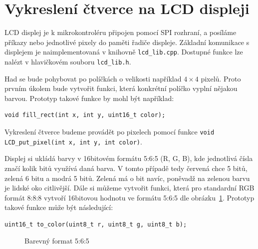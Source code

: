 \documentclass[12pt]{article}
\begin{document}
\section{Vykreslení čtverce na LCD displeji}
LCD displej je k mikrokontroléru připojen pomocí SPI rozhraní, a posíláme příkazy nebo jednotlivé pixely do paměti řadiče displeje.
Základní komunikace s displejem je naimplementovaná v knihovně \texttt{lcd\_lib.cpp}.
Dostupné funkce lze nalézt v hlavičkovém souboru \texttt{lcd\_lib.h}.

Had se bude pohybovat po políčkách o velikosti například $4\times4$ pixelů.
Proto prvním úkolem bude vytvořit funkci, která konkrétní políčko vyplní nějakou barvou.
Prototyp takové funkce by mohl být například:
\begin{verbatim}
void fill_rect(int x, int y, uint16_t color);
\end{verbatim}
Vykreslení čtverce budeme provádět po pixelech pomocí funkce \texttt{void LCD_put_pixel(int x, int y, int color)}.

Displej si ukládá barvy v 16bitovém formátu 5:6:5 (R, G, B), kde jednotlivá čísla značí kolik bitů využívá daná barva.
V tomto případě tedy červená chce 5 bitů, zelená 6 bitu a modrá 5 bitů.
Zelená má o bit navíc, poněvadž na zelenou barvu je lidské oko citlivější.
Dále si můžeme vytvořit funkci, která  pro standardní RGB formát 8:8:8 vytvoří 16bitovou hodnotu ve formátu 5:6:5 dle obrázku~\ref{fig:rgb565}.
Prototyp takové funkce může být následující:
\begin{verbatim}
uint16_t to_color(uint8_t r, uint8_t g, uint8_t b);
\end{verbatim}

\begin{figure}[ht]
	\centering
	\caption{Barevný format 5:6:5}
  \label{fig:rgb565}
\end{figure}
\end{document}
